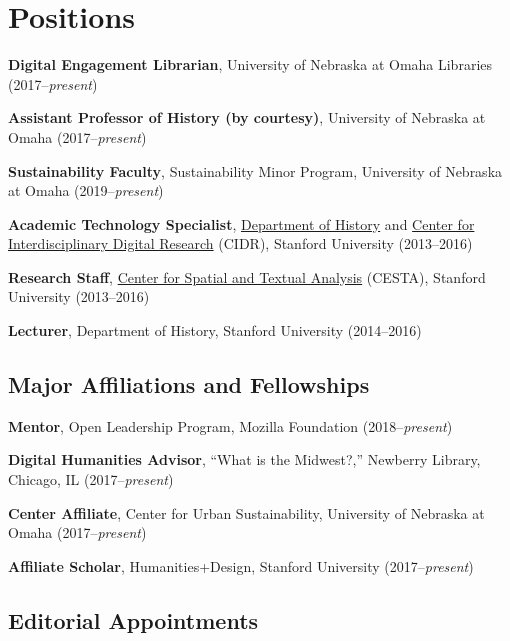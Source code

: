 \section{Positions}\label{positions}

\textbf{Digital Engagement Librarian}, University of Nebraska at Omaha
Libraries (2017--\emph{present})

\textbf{Assistant Professor of History (by courtesy)}, University of
Nebraska at Omaha (2017--\emph{present})

\textbf{Sustainability Faculty}, Sustainability Minor Program,
University of Nebraska at Omaha (2019--\emph{present})

\vspace{.4cm}

\textbf{Academic Technology Specialist},
\href{http://history.stanford.edu}{Department of History} and
\href{http://cidr.stanford.edu}{Center for Interdisciplinary Digital
Research} (CIDR), Stanford University (2013--2016)

\textbf{Research Staff}, \href{http://cesta.stanford.edu}{Center for
Spatial and Textual Analysis} (CESTA), Stanford University (2013--2016)

\textbf{Lecturer}, Department of History, Stanford University
(2014--2016)

\vspace{0.2cm}

\subsection{Major Affiliations and
Fellowships}\label{major-affiliations-and-fellowships}

\textbf{Mentor}, Open Leadership Program, Mozilla Foundation
(2018--\emph{present})

\textbf{Digital Humanities Advisor}, ``What is the Midwest?,'' Newberry
Library, Chicago, IL (2017--\emph{present})

\textbf{Center Affiliate}, Center for Urban Sustainability, University
of Nebraska at Omaha (2017--\emph{present})

\textbf{Affiliate Scholar}, Humanities+Design, Stanford University
(2017--\emph{present})

\vspace{0.2cm}

\subsection{Editorial Appointments}\label{editorial-appointments}

